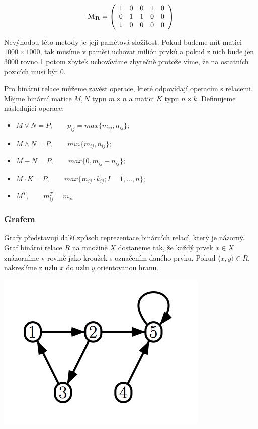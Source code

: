 \begin{displaymath}
{\bf M_R} =
\left( \begin{array}{ccccc}
1 & 0 & 0 & 1 & 0 \\
0 & 1 & 1 & 0 & 0 \\
1 & 0 & 0 & 0 & 0 \\
\end{array} \right)
\end{displaymath}

Nevýhodou této metody je její paměťová složitost. Pokud budeme mít matici $1000 \times 1000$, tak musíme v paměti uchovat milión prvků a pokud z nich bude jen 3000 rovno 1 potom zbytek uchováváme zbytečně protože víme, že na ostatních pozicích musí být 0.

Pro binární relace můžeme zavést operace, které odpovídají operacím s relacemi. Mějme binární matice $M,N$ typu $m \times n$ a matici $K$ typu $n \times k$. Definujeme následující operace:
\begin{itemize}
	\item[] $M \vee N = P, \qquad p_{ij} = max\{m_{ij}, n_{ij}\};$
	\item[] $M \wedge N = P, \qquad min\{m_{ij}, n_{ij}\};$
	\item[] $M - N = P, \qquad max\{0, m_{ij} - n_{ij}\};$
	\item[] $M \cdot K = P, \qquad max\{m_{ij} \cdot k_{ij}; I = 1, \dots ,n\};$
	\item[] $M^T, \qquad m^T_{ij} = m_{ji}$
\end{itemize}

\subsubsection{Grafem}
Grafy představují další způsob reprezentace binárních relací, který je názorný. Graf binární relace $R$ na množině $X$ dostaneme tak, že každý prvek $x \in X$ znázorníme v rovině jako kroužek s označením daného prvku. Pokud $\langle x,y \rangle \in R$, nakreslíme z uzlu $x$ do uzlu $y$ orientovanou hranu.

\begin{center}
	\includegraphics[scale=0.6]{img/RelationGraph}
\end{center}


